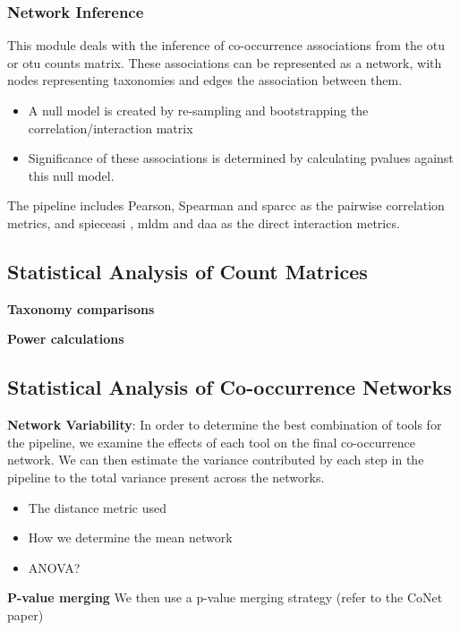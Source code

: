     \subsubsection*{Network Inference}
      \vspace{-5mm}
      This module deals with the inference of co-occurrence associations from the \ac{otu} or \ac{otu} counts matrix.
      These associations can be represented as a network, with nodes representing taxonomies and edges the association between them.
      \begin{itemize}
        \item A null model is created by re-sampling and bootstrapping the correlation/interaction matrix
        \item Significance of these associations is determined by calculating pvalues against this null model.
      \end{itemize}
      The pipeline includes Pearson, Spearman and \ac{sparcc} \cite{Friedman2012} as the pairwise correlation metrics, and \ac{spieceasi} \cite{Kurtz2015}, \ac{mldm} \cite{Yang2017} and \ac{daa} \cite{Menon2018} as the direct interaction metrics.

  \subsection*{Statistical Analysis of Count Matrices}

   \textbf{Taxonomy comparisons}

    \textbf{Power calculations}

  \subsection*{Statistical Analysis of Co-occurrence Networks}

    \textbf{Network Variability}:
    In order to determine the best combination of tools for the pipeline, we examine the effects of each tool on the final co-occurrence network.
    We can then estimate the variance contributed by each step in the pipeline to the total variance present across the networks.
    \begin{itemize}
      \item The distance metric used
      \item How we determine the mean network
      \item ANOVA?
    \end{itemize}

    \textbf{P-value merging}
    We then use a p-value merging strategy (refer to the CoNet paper)

